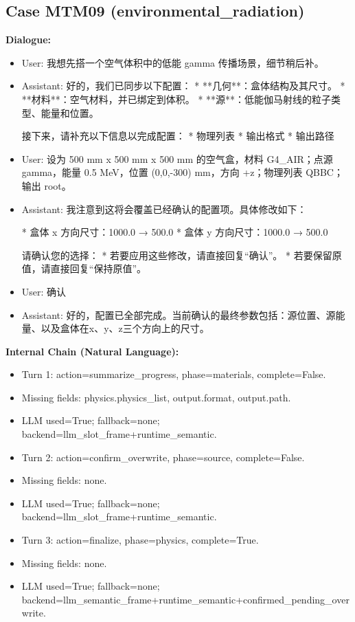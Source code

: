 \documentclass[11pt]{ctexart}
\begin{document}
\subsection{Case MTM09 (environmental\_radiation)}
\textbf{Dialogue:}
\begin{itemize}
\item User: 我想先搭一个空气体积中的低能 gamma 传播场景，细节稍后补。
\item Assistant: 好的，我们已同步以下配置：
*   **几何**：盒体结构及其尺寸。
*   **材料**：空气材料，并已绑定到体积。
*   **源**：低能伽马射线的粒子类型、能量和位置。

接下来，请补充以下信息以完成配置：
*   物理列表
*   输出格式
*   输出路径
\item User: 设为 500 mm x 500 mm x 500 mm 的空气盒，材料 G4\_AIR；点源 gamma，能量 0.5 MeV，位置 (0,0,-300) mm，方向 +z；物理列表 QBBC；输出 root。
\item Assistant: 我注意到这将会覆盖已经确认的配置项。具体修改如下：

*   盒体 x 方向尺寸：1000.0 → 500.0
*   盒体 y 方向尺寸：1000.0 → 500.0

请确认您的选择：
*   若要应用这些修改，请直接回复“确认”。
*   若要保留原值，请直接回复“保持原值”。
\item User: 确认
\item Assistant: 好的，配置已全部完成。当前确认的最终参数包括：源位置、源能量、以及盒体在x、y、z三个方向上的尺寸。
\end{itemize}
\textbf{Internal Chain (Natural Language):}
\begin{itemize}
\item Turn 1: action=summarize\_progress, phase=materials, complete=False.
\item Missing fields: physics.physics\_list, output.format, output.path.
\item LLM used=True; fallback=none; backend=llm\_slot\_frame+runtime\_semantic.
\item Turn 2: action=confirm\_overwrite, phase=source, complete=False.
\item Missing fields: none.
\item LLM used=True; fallback=none; backend=llm\_slot\_frame+runtime\_semantic.
\item Turn 3: action=finalize, phase=physics, complete=True.
\item Missing fields: none.
\item LLM used=True; fallback=none; backend=llm\_semantic\_frame+runtime\_semantic+confirmed\_pending\_overwrite.
\end{itemize}
\end{document}
